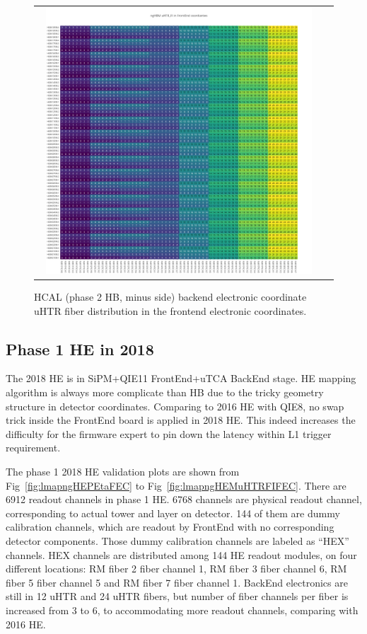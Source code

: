 \begin{figure}[htb]
 \begin{center}
  \begin{tabular}{cc}
   \includegraphics[angle=0,width=0.95\textwidth]{figures/appendix/ngHBM_uHTR_FI_in_FrontEnd.png}
  \end{tabular}
  \caption{HCAL (phase 2 HB, minus side) backend electronic coordinate uHTR fiber distribution in the frontend electronic coordinates.}
  \label{fig:lmapngHBMuHTRFIFEC}
 \end{center}
\end{figure}
\clearpage

\subsection{Phase 1 HE in 2018}
The 2018 HE is in SiPM+QIE11 FrontEnd+uTCA BackEnd stage. HE mapping algorithm is always more complicate than HB due to the tricky geometry structure in detector coordinates. Comparing to 2016 HE with QIE8, no swap trick inside the FrontEnd board is applied in 2018 HE. This indeed increases the difficulty for the firmware expert to pin down the latency within L1 trigger requirement. 

The phase 1 2018 HE validation plots are shown from Fig~\ref{fig:lmapngHEPEtaFEC} to Fig~\ref{fig:lmapngHEMuHTRFIFEC}. There are 6912 readout channels in phase 1 HE. 6768 channels are physical readout channel, corresponding to actual tower and layer on detector. 144 of them are dummy calibration channels, which are readout by FrontEnd with no corresponding detector components. Those dummy calibration channels are labeled as “HEX” channels. HEX channels are distributed among 144 HE readout modules, on four different locations: RM fiber 2 fiber channel 1, RM fiber 3 fiber channel 6, RM fiber 5 fiber channel 5 and RM fiber 7 fiber channel 1. BackEnd electronics are still in 12 uHTR and 24 uHTR fibers, but number of fiber channels per fiber is increased from 3 to 6, to accommodating more readout channels, comparing with 2016 HE.
\clearpage

